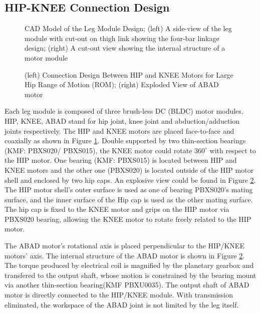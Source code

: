 \subsection{\textbf{HIP-KNEE Connection Design}}
\label{sec:Design4ROM}

\begin{figure}
	\centering
	\caption{CAD Model of the Leg Module Design; (left) A side-view of the leg module with cut-out on thigh link showing the four-bar linkage design; (right) A cut-out view showing the internal structure of a motor module}
	\label{fig:LegDesign}
\end{figure}
\begin{figure}
	\centering
	\caption{(left) Connection Design Between HIP and KNEE Motors for Large Hip Range of Motion (ROM); (right) Exploded View of ABAD motor}
	\label{fig:KMFbearings}
\end{figure}

Each leg module is composed of three brush-less DC (BLDC) motor modules. HIP, KNEE, ABAD stand for hip joint, knee joint and abduction/adduction joints respectively. The HIP and KNEE motors are placed face-to-face and coaxially as shown in Figure \ref{fig:LegDesign}. Double supported by two thin-section bearings (KMF: PBXS020/ PBXS015), the KNEE motor could rotate $360^{\circ}$ with respect to the HIP motor. One bearing (KMF: PBXS015) is located between HIP and KNEE motors and the other one (PBXS020) is located outside of the HIP motor shell and enclosed by two hip caps. An explosive view could be found in Figure \ref{fig:KMFbearings}. The HIP motor shell's outer surface is used as one of bearing PBXS020's mating surface, and the inner surface of the Hip cap is used as the other mating surface. The hip cap is fixed to the KNEE motor and grips on the HIP motor via PBXS020 bearing, allowing the KNEE motor to rotate freely related to the HIP motor.

The ABAD motor's rotational axis is placed perpendicular to the HIP/KNEE motors' axis. The internal structure of the ABAD motor is shown in Figure \ref{fig:KMFbearings}. The torque produced by electrical coil is magnified by the planetary gearbox and transfered to the output shaft, whose motion is constrained by the bearing mount via another thin-section bearing(KMF PBXU0035). The output shaft of ABAD motor is directly connected to the HIP/KNEE module. With transmission eliminated, the workspace of the ABAD joint is not limited by the leg itself. 

